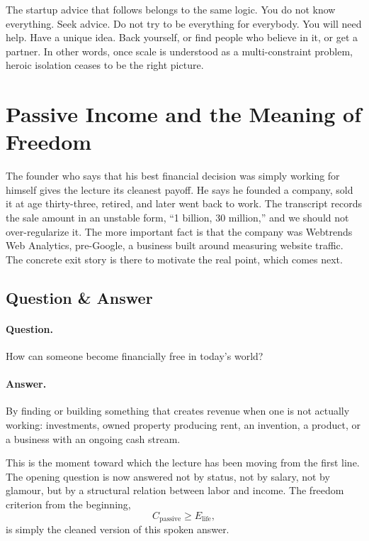 The startup advice that follows belongs to the same logic. You do not know everything. Seek advice. Do not try to be everything for everybody. You will need help. Have a unique idea. Back yourself, or find people who believe in it, or get a partner. In other words, once scale is understood as a multi-constraint problem, heroic isolation ceases to be the right picture.

\section{Passive Income and the Meaning of Freedom}

The founder who says that his best financial decision was simply working for himself gives the lecture its cleanest payoff. He says he founded a company, sold it at age thirty-three, retired, and later went back to work. The transcript records the sale amount in an unstable form, ``1 billion, 30 million,'' and we should not over-regularize it. The more important fact is that the company was Webtrends Web Analytics, pre-Google, a business built around measuring website traffic. The concrete exit story is there to motivate the real point, which comes next.

\subsection{Question \& Answer}

\paragraph{Question.}
How can someone become financially free in today's world?

\paragraph{Answer.}
By finding or building something that creates revenue when one is not actually working: investments, owned property producing rent, an invention, a product, or a business with an ongoing cash stream.

This is the moment toward which the lecture has been moving from the first line. The opening question is now answered not by status, not by salary, not by glamour, but by a structural relation between labor and income. The freedom criterion from the beginning,
\[
C_{\text{passive}} \ge E_{\text{life}},
\]
is simply the cleaned version of this spoken answer.

